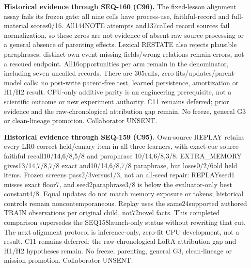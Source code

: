 \documentclass{article}
\begin{document}
\noindent\textbf{Historical evidence through SEQ-160 (C96).}
The fixed-lesson alignment assay fails its frozen gate: all nine cells have
process-use, faithful-record and full-material scores0/16. All144NOTE attempts
and137called record sources fail normalization, so these zeros are not evidence
of absent raw source processing or a general absence of parenting effects.
Lexical RESTATE also rejects plausible paraphrases; distinct own-event missing
fields/wrong relations remain errors, not a rescued endpoint. All16opportunities
per arm remain in the denominator, including seven uncalled records. There are
305calls, zero fits/updates/parent-model calls: no post-write parent-free test, learned
persistence, amortization or H1/H2 result. CPU-only additive parity is an
engineering prerequisite, not a scientific outcome or new experiment authority.
C11 remains deferred; prior evidence and the raw-chronological attribution gap
remain. No freeze, general G3 or clean-lineage promotion. Collaborator UNSENT.

\noindent\textbf{Historical evidence through SEQ-159 (C95).}
Own-source REPLAY retains every LR0-correct held/canary item in all three
learners, with exact-cue source-faithful recall10/14,6/8,5/8 and paraphrase
10/14,6/8,3/8. EXTRA\_MEMORY gives13/14,7/8,7/8 exact and10/14,6/8,7/8
paraphrase, but loses0/2/6old held items. Frozen screens pass2/3versus1/3,
not an all-seed repair: REPLAYseed1 misses exact floor7, and seed2paraphrase3/8
is below the evaluator-only best constant4/8. Equal updates do not match memory
exposure or tokens; historical controls remain noncontemporaneous. Replay uses
the same24supported authored TRAIN observations per original child, not72novel
facts. This completed comparison supersedes the SEQ158launch-only status without
rewriting that cut. The next alignment protocol is inference-only, zero-fit CPU
development, not a result. C11 remains deferred; the raw-chronological LoRA
attribution gap and H1/H2 hypotheses remain. No freeze, parenting, general G3,
clean-lineage or mission promotion. Collaborator UNSENT.
\end{document}
